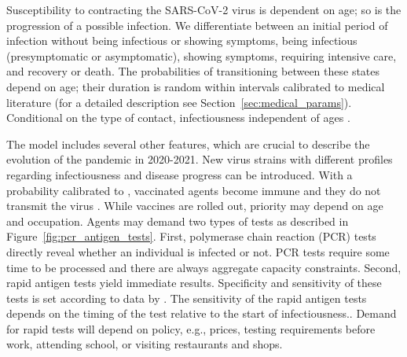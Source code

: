 Susceptibility to contracting the SARS-CoV-2 virus is dependent on age; so is the
progression of a possible infection. We differentiate between an initial period of
infection without being infectious or showing symptoms, being infectious (presymptomatic
or asymptomatic), showing symptoms, requiring intensive care, and recovery or death. The
probabilities of transitioning between these states depend on age; their duration is
random within intervals calibrated to medical literature (for a detailed description see
Section~\ref{sec:medical_params}). Conditional on the type of contact, infectiousness
independent of ages \citep{Jones2021}.

The model includes several other features, which are crucial to describe the evolution
of the pandemic in 2020-2021. New virus strains with different profiles regarding
infectiousness and disease progress can be introduced. With a probability calibrated to
\cite{Hunter2021}, vaccinated agents become immune and they do not transmit the virus
\citep{Petter2021, LevineTiefenbrun2021, Pritchard2021}.
While vaccines are rolled out, priority may depend on age and occupation. Agents may
demand two types of tests as described in Figure~\ref{fig:pcr_antigen_tests}. First,
polymerase chain reaction (PCR) tests directly reveal whether an individual is infected
or not. PCR tests require some time to be processed and there are always aggregate
capacity constraints. Second, rapid antigen tests yield immediate results. Specificity
and sensitivity of these tests is set according to data by \cite{Bruemmer2021,
Smith2021} . The sensitivity of the rapid antigen tests depends on the timing of the
test relative to the start of infectiousness.. Demand for rapid tests will depend on policy, e.g., prices,
testing requirements before work, attending school, or visiting restaurants and shops.

